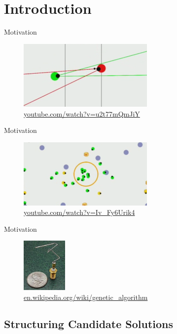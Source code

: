 
\section{Introduction}

\begin{frame}{Motivation}
  \begin{figure}
    \centering
    \includegraphics[width=250px]{elias/images/sniper.png}
    \caption{\url{youtube.com/watch?v=u2t77mQmJiY}}
  \end{figure}
\end{frame}

\begin{frame}{Motivation}
  \begin{figure}
    \centering
    \includegraphics[width=250px]{elias/images/swarm.png}
    \caption{\url{youtube.com/watch?v=Iv_Fy6Urik4}}
  \end{figure}
\end{frame}

\begin{frame}{Motivation}
  \begin{figure}
    \centering
    \includegraphics[height=100px]{elias/images/antenna.jpg}
    \caption{\url{en.wikipedia.org/wiki/genetic_algorithm}}
  \end{figure}
\end{frame}

\subsection{Structuring Candidate Solutions}

